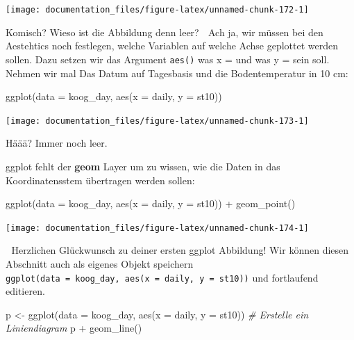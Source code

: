 \documentclass[
]{article}
\newenvironment{Shaded}{\begin{snugshade}}{\end{snugshade}}
\newcommand{\AttributeTok}[1]{\textcolor[rgb]{0.77,0.63,0.00}{#1}}
\newcommand{\CommentTok}[1]{\textcolor[rgb]{0.56,0.35,0.01}{\textit{#1}}}
\newcommand{\FunctionTok}[1]{\textcolor[rgb]{0.00,0.00,0.00}{#1}}
\newcommand{\NormalTok}[1]{#1}
\newcommand{\OtherTok}[1]{\textcolor[rgb]{0.56,0.35,0.01}{#1}}
\newcommand{\SpecialCharTok}[1]{\textcolor[rgb]{0.00,0.00,0.00}{#1}}
\begin{document}
\begin{center}\texttt{[image: documentation\_files/figure-latex/unnamed-chunk-172-1]} \end{center}

Komisch? Wieso ist die Abbildung denn leer? 🤯 Ach ja, wir müssen bei den Aestehtics noch festlegen, welche Variablen auf welche Achse geplottet werden sollen. Dazu setzen wir das Argument \texttt{aes()} was x = und was y = sein soll. Nehmen wir mal Das Datum auf Tagesbasis und die Bodentemperatur in 10 cm:

\begin{Shaded}
\begin{Highlighting}[]
\FunctionTok{ggplot}\NormalTok{(}\AttributeTok{data =}\NormalTok{ koog\_day, }\FunctionTok{aes}\NormalTok{(}\AttributeTok{x =}\NormalTok{ daily, }\AttributeTok{y =}\NormalTok{ st10))}
\end{Highlighting}
\end{Shaded}

\begin{center}\texttt{[image: documentation\_files/figure-latex/unnamed-chunk-173-1]} \end{center}

Häää? Immer noch leer.

ggplot fehlt der \textbf{geom} Layer um zu wissen, wie die Daten in das Koordinatensstem übertragen werden sollen:

\begin{Shaded}
\begin{Highlighting}[]
\FunctionTok{ggplot}\NormalTok{(}\AttributeTok{data =}\NormalTok{ koog\_day, }\FunctionTok{aes}\NormalTok{(}\AttributeTok{x =}\NormalTok{ daily, }\AttributeTok{y =}\NormalTok{ st10)) }\SpecialCharTok{+}
  \FunctionTok{geom\_point}\NormalTok{()}
\end{Highlighting}
\end{Shaded}

\begin{center}\texttt{[image: documentation\_files/figure-latex/unnamed-chunk-174-1]} \end{center}

🎉 Herzlichen Glückwunsch zu deiner ersten ggplot Abbildung! Wir können diesen Abschnitt auch als eigenes Objekt speichern \texttt{ggplot(data\ =\ koog\_day,\ aes(x\ =\ daily,\ y\ =\ st10))} und fortlaufend editieren.

\begin{Shaded}
\begin{Highlighting}[]
\NormalTok{p }\OtherTok{\textless{}{-}} \FunctionTok{ggplot}\NormalTok{(}\AttributeTok{data =}\NormalTok{ koog\_day, }\FunctionTok{aes}\NormalTok{(}\AttributeTok{x =}\NormalTok{ daily, }\AttributeTok{y =}\NormalTok{ st10))}
\CommentTok{\# Erstelle ein Liniendiagram}
\NormalTok{p }\SpecialCharTok{+} \FunctionTok{geom\_line}\NormalTok{()}
\end{Highlighting}
\end{Shaded}
\end{document}
